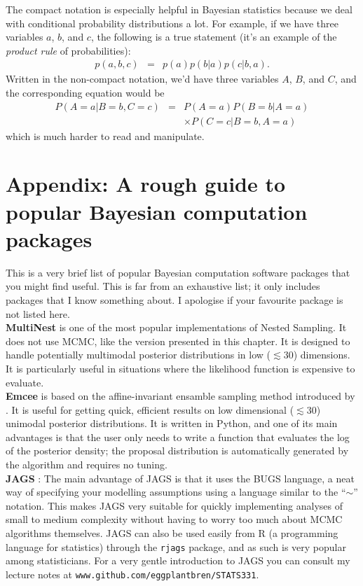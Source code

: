 The compact notation is especially helpful in Bayesian statistics because
we deal with conditional probability distributions a lot. For example, if we
have three variables $a$, $b$, and $c$, the following is a true statement
(it's an example of the {\it product rule} of probabilities):
\begin{eqnarray}
p(a, b, c) &=& p(a)p(b|a)p(c|b,a).
\end{eqnarray}
Written in the non-compact notation, we'd have three variables $A$, $B$, and
$C$, and the corresponding equation would be
\begin{eqnarray}
P(A=a | B=b, C=c) &=&
 P(A=a)P(B=b|A=a)\\
& & \times P(C=c|B=b,A=a)
\end{eqnarray}
which is much harder to read and manipulate.

\section{Appendix: A rough guide to popular Bayesian computation packages}
This is a very brief list of popular Bayesian computation software packages
that you might find useful. This is far from an exhaustive list; it only
includes packages that I know something about. I apologise if your favourite
package is not listed here.\\

{\bf MultiNest} \citep{multinest} is one of the most popular implementations of
Nested Sampling. It does not use MCMC, like the version presented in this
chapter. It is designed to handle potentially multimodal posterior
distributions in low ($\lesssim 30$) dimensions. It is particularly useful in
situations where the likelihood function is expensive to evaluate.\\

{\bf Emcee} \citep{emcee} is based on the affine-invariant ensamble sampling
method introduced by \citep{goodman}. It is useful for getting quick, efficient results on low
dimensional ($\lesssim 30$) unimodal posterior distributions.
It is written in Python, and one of its main advantages is that the user only
needs to write a function that evaluates the log of the posterior density;
the proposal distribution is automatically generated by the algorithm and
requires no tuning.\\

{\bf JAGS} \citep{jags}: The main advantage of JAGS is that it
uses the BUGS language, a neat way of specifying your modelling assumptions
using a language similar to the ``$\sim$'' notation. This makes JAGS very
suitable for quickly implementing analyses of small to medium complexity without
having to worry too much about MCMC algorithms themselves. JAGS can also be
used easily from R (a programming language for statistics)
through the {\tt rjags} package, and as such is very popular among
statisticians. For a very gentle
introduction to JAGS you can consult my lecture notes at
{\tt www.github.com/eggplantbren/STATS331}.\\

